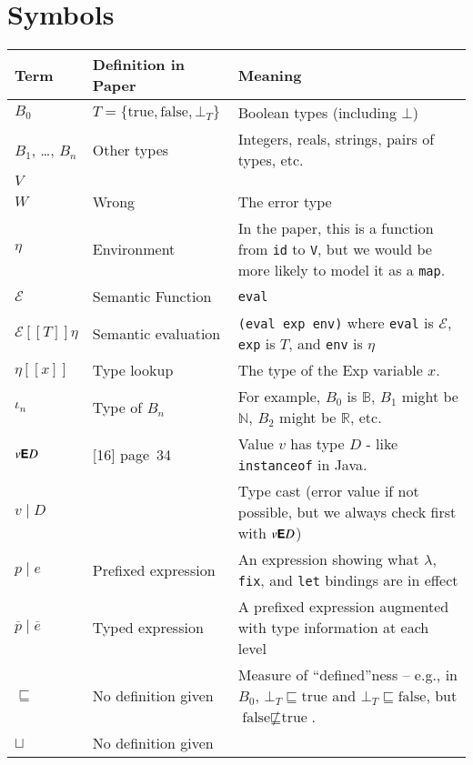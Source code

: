 \documentclass[12pt]{article}
\newcommand{\B}{\mathbb{B}}
\newcommand{\N}{\mathbb{N}}
\newcommand{\R}{\mathbb{R}}
\newcommand{\instanceof}[2]{#1\textsf{\textbf{E}}#2}
\newcommand{\cast}[2]{#1\mid#2}
\newcommand{\pe}[2]{#1\mid#2}
\newcommand{\tpe}[2]{\overline{#1}\mid\overline{#2}}
\begin{document}
\section{Symbols}

\begin{tabular}{l p{} p{}}
\toprule
Term & Definition in Paper & Meaning \\
\midrule
$B_0$ & $T = \{\text{true}, \text{false}, \bot_T\}$ & Boolean types (including $\bot$) \\
$B_1$, \ldots, $B_n$ & Other types & Integers, reals, strings, pairs of types, etc. \\
$V$ &  & \\
$W$ & Wrong & The error type \\
$\eta$ & Environment & In the paper, this is a function from \texttt{id} to \texttt{V}, but we would be more likely to model it as a \texttt{map}.\\
$\mathscr{E}$   & Semantic Function & \texttt{eval} \\
$\mathscr{E}[\![T]\!]\eta$ & Semantic evaluation & \texttt{(eval exp env)} where \texttt{eval} is $\mathscr{E}$, \texttt{exp} is $T$, and \texttt{env} is $\eta$ \\
$\mathscr{\eta}[\![x]\!]$ & Type lookup & The type of the Exp variable $x$. \\
$\iota_n$ & Type of $B_n$ & For example, $B_0$ is $\B$, $B_1$ might be $\N$, $B_2$ might be $\R$, etc. \\
$\instanceof{v}{D}$ & [16] page~34 & Value $v$ has type $D$ - like \texttt{instanceof} in Java. \\
$\cast{v}{D}$ & & Type cast (error value if not possible, but we always check first with $\instanceof{v}{D}$) \\

$\pe{p}{e}$ & Prefixed expression & An expression showing what $\lambda$, \texttt{fix}, and \texttt{let} bindings are in effect \\
$\tpe{p}{e}$ & Typed expression &  A prefixed expression augmented with type information at each level \\
$\sqsubseteq$ & No definition given & Measure of ``defined''ness -- e.g., in $B_0$, $\bot_T \sqsubseteq \text{true}$ and $\bot_T \sqsubseteq \text{false}$, but $\text{false} \nsqsubseteq \text{true}$. \\
$\sqcup$ & No definition given & \\

\bottomrule
\end{tabular}
\end{document}
